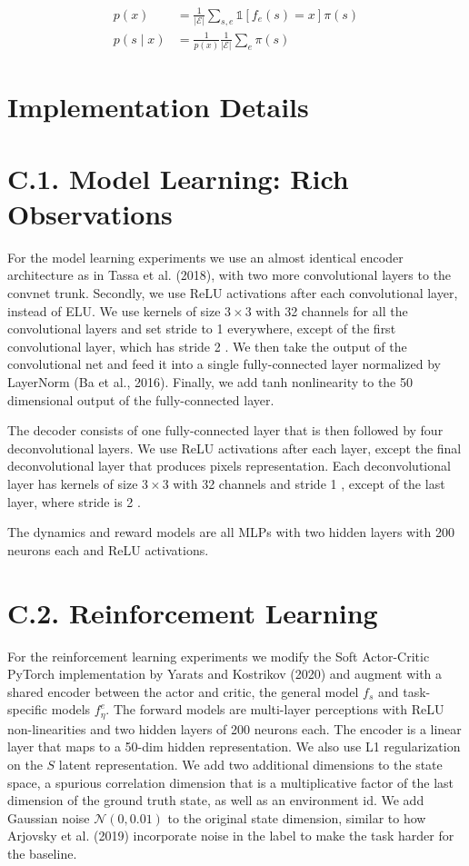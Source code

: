 \documentclass[10pt]{article}
\begin{document}
\[
\begin{aligned}
p(x) & =\frac{1}{|\mathcal{E}|} \sum_{s, e} \mathbb{1}\left[f_{e}(s)=x\right] \pi(s) \\
p(s \mid x) & =\frac{1}{p(x)} \frac{1}{|\mathcal{E}|} \sum_{e} \pi(s)
\end{aligned}
\]

\section{Implementation Details}
\section{C.1. Model Learning: Rich Observations}
For the model learning experiments we use an almost identical encoder architecture as in Tassa et al. (2018), with two more convolutional layers to the convnet trunk. Secondly, we use ReLU activations after each convolutional layer, instead of ELU. We use kernels of size $3 \times 3$ with 32 channels for all the convolutional layers and set stride to 1 everywhere, except of the first convolutional layer, which has stride 2 . We then take the output of the convolutional net and feed it into a single fully-connected layer normalized by LayerNorm (Ba et al., 2016). Finally, we add tanh nonlinearity to the 50 dimensional output of the fully-connected layer.

The decoder consists of one fully-connected layer that is then followed by four deconvolutional layers. We use ReLU activations after each layer, except the final deconvolutional layer that produces pixels representation. Each deconvolutional layer has kernels of size $3 \times 3$ with 32 channels and stride 1 , except of the last layer, where stride is 2 .

The dynamics and reward models are all MLPs with two hidden layers with 200 neurons each and ReLU activations.

\section{C.2. Reinforcement Learning}
For the reinforcement learning experiments we modify the Soft Actor-Critic PyTorch implementation by Yarats and Kostrikov (2020) and augment with a shared encoder between the actor and critic, the general model $f_{s}$ and task-specific models $f_{\eta}^{e}$. The forward models are multi-layer perceptions with ReLU non-linearities and two hidden layers of 200 neurons each. The encoder is a linear layer that maps to a 50-dim hidden representation. We also use L1 regularization on the $S$ latent representation. We add two additional dimensions to the state space, a spurious correlation dimension that is a multiplicative factor of the last dimension of the ground truth state, as well as an environment id. We add Gaussian noise $\mathcal{N}(0,0.01)$ to the original state dimension, similar to how Arjovsky et al. (2019) incorporate noise in the label to make the task harder for the baseline.
\end{document}
